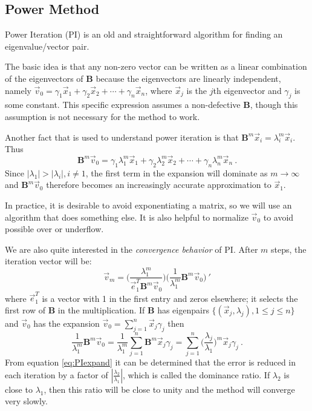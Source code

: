 \documentclass[12pt]{article}
\newcommand{\ve}[1]{\ensuremath{\mathbf{#1}}}
\begin{document}
\subsection*{Power Method}

Power Iteration (PI) is an old and straightforward algorithm for finding an eigenvalue/vector pair. 

The basic idea is that any non-zero vector can be written as a linear combination of the eigenvectors of $\ve{B}$ because the eigenvectors are linearly independent, namely $\vec{v}_0 = \gamma_1 \vec{x}_1 + \gamma_2 \vec{x}_2 + \cdots + \gamma_n \vec{x}_n$, where $\vec{x}_{j}$ is the $j$th eigenvector and $\gamma_{j}$ is some constant. This specific expression assumes a non-defective $\ve{B}$, though this assumption is not necessary for the method to work. 

Another fact that is used to understand power iteration is that $\ve{B}^m \vec{x}_i = \lambda_i^m \vec{x}_i$. Thus
%
\begin{equation}
  \ve{B}^m \vec{v}_{0} = \gamma_1 \lambda_1^m \vec{x}_1 + \gamma_2 \lambda_2^m \vec{x}_2 + \cdots + \gamma_n \lambda_n^m \vec{x}_n \:.\nonumber
  \label{eq:Ak}
\end{equation}
%
Since $|\lambda_1| > |\lambda_i|, i \ne 1$, the first term in the expansion will dominate as $m \to \infty$ and $\ve{B}^m \vec{v}_{0}$ therefore becomes an increasingly accurate approximation to $\vec{x}_1$. 

In practice, it is desirable to avoid exponentiating a matrix, so we will use an algorithm that does something else. It is also helpful to normalize $\vec{v}_0$ to avoid possible over or underflow.

We are also quite interested in the \textit{convergence behavior} of PI. After $m$ steps, the iteration vector will be: 
%
\begin{equation}
  \vec{v}_{m} = \bigl( \frac{\lambda_{1}^{m}}{\vec{e}_{1}^{T}\ve{B}^{m}\vec{v}_{0}} \bigr) \bigl(\frac{1}{\lambda_{1}^{m}}\ve{B}^{m}\vec{v}_{0} \bigr) \:' \nonumber
\end{equation}
% 
where $\vec{e}_{1}^{T}$ is a vector with 1 in the first entry and zeros elsewhere; it selects the first row of $\ve{B}$ in the multiplication. If $\ve{B}$ has eigenpairs $\{(\vec{x}_{j}, \lambda_{j}), 1 \le j \le n \}$ and $\vec{v}_{0}$ has the expansion $\vec{v}_{0} = \sum_{j=1}^{n} \vec{x}_{j}\gamma_{j}$ then
%
\begin{equation}
  \frac{1}{\lambda_{1}^{m}}\ve{B}^{m}\vec{v}_{0} =  \frac{1}{\lambda_{1}^{m}} \sum_{j=1}^{n} \ve{B}^{m}\vec{x}_{j}\gamma_{j} = \sum_{j=1}^{n} \bigl(\frac{\lambda_{j}}{\lambda_{1}} \bigr)^m \vec{x}_{j} \gamma_{j} \:.
  \label{eq:PIexpand}
\end{equation}
%
From equation \eqref{eq:PIexpand} it can be determined that the error is reduced in each iteration by a factor of $|\frac{\lambda_{2}}{\lambda_{1}}|$, which is called the dominance ratio. If $\lambda_2$ is close to $\lambda_1$, then this ratio will be close to unity and the method will converge very slowly. 
\end{document}
